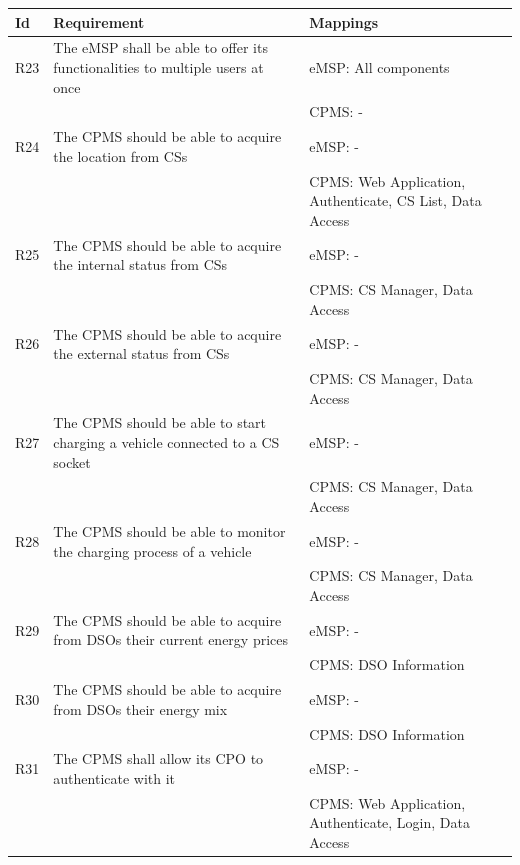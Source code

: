 \documentclass[11pt]{article}
\begin{document}
\begin{table}[H]
    \centering
    \setlength{\tabcolsep}{18pt}
    \renewcommand{\arraystretch}{1.2}
    \begin{tabularx}{\textwidth}{|>{\centering\hsize=0.15\hsize}X|>{\hsize=1.425\hsize}X|>{\hsize=1.425\hsize}X|}
        \hline
        \textbf{Id} & \textbf{Requirement} & \textbf{Mappings} \\
        \hline
        R23 & The eMSP shall be able to offer its functionalities to multiple users at once & eMSP: All components \\
        & & CPMS: - \\
        \hline
        R24 & The CPMS should be able to acquire the location from CSs & eMSP: - \\
        & & CPMS: Web Application, Authenticate, CS List, Data Access \\
        \hline
        R25 & The CPMS should be able to acquire the internal status from CSs & eMSP: - \\
        & & CPMS: CS Manager, Data Access \\
        \hline
        R26 & The CPMS should be able to acquire the external status from CSs & eMSP: - \\
        & & CPMS: CS Manager, Data Access \\
        \hline
        R27 & The CPMS should be able to start charging a vehicle connected to a CS socket & eMSP: - \\
        & & CPMS: CS Manager, Data Access \\
        \hline
        R28 & The CPMS should be able to monitor the charging process of a vehicle & eMSP: - \\
        & & CPMS: CS Manager, Data Access \\
        \hline
        R29 & The CPMS should be able to acquire from DSOs their current energy prices & eMSP: - \\
        & & CPMS: DSO Information \\
        \hline
        R30 & The CPMS should be able to acquire from DSOs their energy mix & eMSP: - \\
        & & CPMS: DSO Information \\
        \hline
        R31 & The CPMS shall allow its CPO to authenticate with it & eMSP: - \\
        & & CPMS: Web Application, Authenticate, Login, Data Access \\

\end{tabularx}
\end{table}
\end{document}
